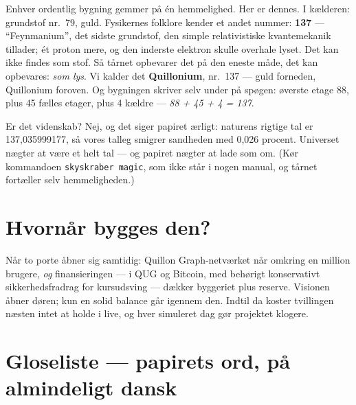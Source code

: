 \documentclass[11pt,a4paper]{article}
\begin{document}
Enhver ordentlig bygning gemmer på én hemmelighed. Her er dennes. I kælderen:
grundstof nr.\ 79, guld. Fysikernes folklore kender et andet nummer:
\textbf{137} --- ``Feynmanium'', det sidste grundstof, den simple relativistiske
kvantemekanik tillader; ét proton mere, og den inderste elektron skulle overhale
lyset. Det kan ikke findes som stof. Så tårnet opbevarer det på den eneste måde,
det kan opbevares: \emph{som lys}. Vi kalder det \textbf{Quillonium}, nr.\ 137
--- guld forneden, Quillonium foroven. Og bygningen skriver selv under på
spøgen: øverste etage 88, plus 45 fælles etager, plus 4 kældre --- \emph{88 + 45
+ 4 = 137}.

Er det videnskab? Nej, og det siger papiret ærligt: naturens rigtige tal er
137{,}035999177, så vores talleg smigrer sandheden med 0{,}026 procent.
Universet nægter at være et helt tal --- og papiret nægter at lade som om.
(Kør kommandoen \texttt{skyskraber magic}, som ikke står i nogen manual, og
tårnet fortæller selv hemmeligheden.)

\section*{Hvornår bygges den?}

Når to porte åbner sig samtidig: Quillon Graph-netværket når omkring en
million brugere, \emph{og} finansieringen --- i QUG og Bitcoin, med behørigt
konservativt sikkerhedsfradrag for kursudsving --- dækker byggeriet plus
reserve. Visionen åbner døren; kun en solid balance går igennem den. Indtil da
koster tvillingen næsten intet at holde i live, og hver simuleret dag gør
projektet klogere.

\section*{Gloseliste --- papirets ord, på almindeligt dansk}
\end{document}
